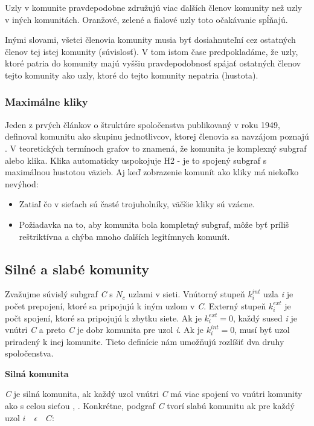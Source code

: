 \documentclass[slovak,master,public,dept460,male,cpdeclaration,oneside]{diploma}
\begin{document}
Uzly v komunite pravdepodobne združujú viac ďalších členov komunity než uzly v iných komunitách. Oranžové, zelené a fialové uzly toto očakávanie spĺňajú. \cite{barabasi2016network}

\bigskip
Inými slovami, všetci členovia komunity musia byť dosiahnuteľní cez ostatných členov tej istej komunity (súvislosť). V tom istom čase predpokladáme, že uzly, ktoré patria do komunity majú vyššiu pravdepodobnosť spájať ostatných členov tejto komunity ako uzly, ktoré do tejto komunity nepatria (hustota). \cite{barabasi2016network}

\subsubsection{Maximálne kliky}
Jeden z prvých článkov o štruktúre spoločenstva publikovaný v roku 1949, definoval komunitu ako skupinu jednotlivcov, ktorej členovia sa navzájom poznajú \cite{luce1949method}. V teoretických termínoch grafov to znamená, že komunita je komplexný subgraf alebo klika. Klika automaticky uspokojuje H2 - je to spojený subgraf s maximálnou hustotou väzieb. Aj keď zobrazenie komunít ako kliky má niekoľko nevýhod: 
\begin{itemize}
\item Zatiaľ čo v sieťach sú časté trojuholníky, väčšie kliky sú vzácne. 
\item Požiadavka na to, aby komunita bola kompletný subgraf, môže byť príliš reštriktívna a chýba mnoho ďalších legitímnych komunít. \cite{barabasi2016network}
\end{itemize}


\subsection{Silné a slabé komunity}
Zvažujme súvislý subgraf \textit{C} s \textit{$N_{c}$} uzlami v sieti. Vnútorný stupeň $k_{i}^{int}$ uzla \textit{i} je počet prepojení, ktoré sa pripojujú k iným uzlom v \textit{C}. Externý stupeň $k_{i}^{ext}$ je počt spojení, ktoré sa pripojujú k zbytku siete. Ak je $k_{i}^{ext} = 0$, každý sused \textit{i} je vnútri \textit{C} a preto  \textit{C} je dobr komunita pre uzol \textit{i}. Ak je $k_{i}^{int} = 0$, musí byť uzol priradený k inej komunite. Tieto definície nám umožňujú rozlíšiť dva druhy spoločenstva. \cite{barabasi2016network}

\noindent\textbf{Silná komunita}


\textit{C} je silná komunita, ak každý uzol vnútri \textit{C} má viac spojení vo vnútri komunity ako s celou sieťou \cite{flake2000efficient}, \cite{radicchi2004defining}. Konkrétne, podgraf \textit{C} tvorí slabú komunitu ak pre každý uzol \textit{$i\quad \epsilon \quad C$}: 
\end{document}

